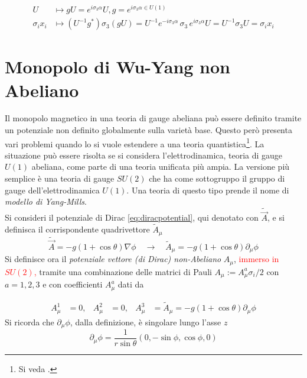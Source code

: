 \begin{equation}
   \begin{aligned}
      U & \mapsto gU = e^{i \sigma_3 \alpha} U ,  g = e^{i\sigma_3 \alpha \in U(1)} \\
      \sigma_i x_i & \mapsto
         (U^{-1} g^*) \sigma_3 (g U)
         = U^{-1}e^{-i \sigma_3 \alpha}\, \sigma_3 \, e^{i \sigma_3 \alpha}U
         = U^{-1}\sigma_3 U =\sigma_i x_i
   \end{aligned}
\end{equation}
\section{Monopolo di Wu-Yang non Abeliano}
Il monopolo magnetico in una teoria di gauge abeliana può essere definito tramite
un potenziale non definito globalmente sulla varietà base. Questo però presenta
vari problemi quando lo si vuole estendere a una teoria quantistica\footnote{
   Si veda \cite{nakahara}.
}.
La situazione può essere risolta se si considera l'elettrodinamica, teoria
di gauge $U(1)$ abeliana, come parte di una teoria unificata più ampia. La versione
più semplice è una teoria di gauge $SU(2)$ che ha come sottogruppo il gruppo
di gauge dell'elettrodinamica $U(1)$. Una teoria di questo tipo prende il nome
di \emph{modello di Yang-Mills}. \\

Si consideri il potenziale di Dirac \ref{eq:diracpotential}, qui denotato con
$\tilde{\vec A}$, e si definisca il corrispondente quadrivettore $\tilde{A}_\mu$
$$
   \tilde{\vec A} = -g(1 + \cos\theta) \nabla \phi
   \quad \to \quad
   \tilde{A}_\mu = -g(1 + \cos\theta) \partial_\mu \phi
$$
Si definisce ora il \emph{potenziale vettore (di Dirac) non-Abeliano} $A_\mu$, \textcolor{red}{
immerso in $SU(2)$,} tramite una combinazione delle matrici di Pauli
$A_\mu := A_\mu^a \sigma_i/2$ con $a = 1,2,3$ e con coefficienti $A_\mu^a$ dati da

\begin{equation}\label{eq:wuyangpotential}
   \begin{aligned}
      A_\mu^1 &= 0, & A_\mu^2 &= 0, & A_\mu^3 &= \tilde{A}_\mu =
         -g(1 + \cos\theta) \partial_\mu \phi
   \end{aligned}
\end{equation}
Si ricorda che $\partial_\mu \phi$, dalla definizione, è singolare lungo l'asse $z$
$$
   \partial_\mu \phi = \frac{1}{r \sin\theta} (0,-\sin\phi,\cos\phi,0)
$$

